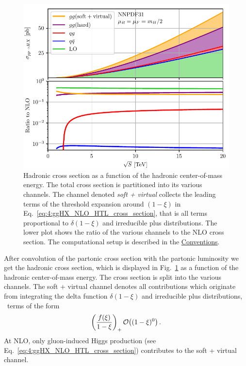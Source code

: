 \begin{figure}[ht]
\centering
\includegraphics[width=\figurewidth]{Images/channel_comparison_HTL_NLO.pdf}
\caption{Hadronic cross section as a function of the hadronic center-of-mass energy. The total cross section is partitioned into its various channels. The channel denoted \textit{soft + virtual} collects the leading terms of the threshold expansion around $(1 - \xi)$ in Eq.~\eqref{eq:4:ggHX_NLO_HTL_cross_section}, that is all terms proportional to $\delta (1 - \xi)$ and irreducible plus distributions. The lower plot shows the ratio of the various channels to the \acs{NLO} cross section. The computational setup is described in the \hyperref[chap:notation_and_conventions]{Conventions}.}
\label{fig:4:channel_comparison}
\end{figure}
After convolution of the partonic cross section with the partonic luminosity we get the hadronic cross section, which is displayed in Fig.~\ref{fig:4:channel_comparison} as a function of the hadronic center-of-mass energy. The cross section is split into the various channels. The soft + virtual channel denotes all contributions which originate from integrating the delta function $\delta (1 - \xi)$ and irreducible plus distributions, \ie\ terms of the form
\begin{equation}
\left(\frac{f(\xi)}{1 - \xi} \right)_+ \mathcal{O}\!\left((1 - \xi)^0\right).
\end{equation}
At \acs{NLO}, only gluon-induced Higgs production (see Eq.~\eqref{eq:4:ggHX_NLO_HTL_cross_section}) contributes to the soft + virtual channel.

